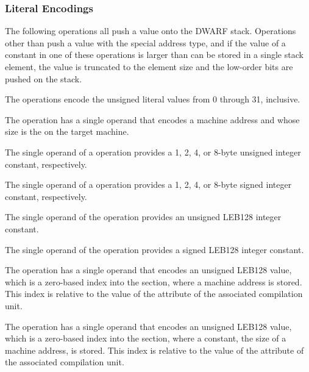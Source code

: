 \subsubsection{Literal Encodings}
\label{chap:literalencodings}
The 
following operations all push a value onto the DWARF
stack. 
Operations other than \DWOPconsttype{} push a value with the special 
address type, and if the value of a constant in one of these operations
is larger than can be stored in a single stack element, the
value is truncated to the element size and the low-order bits
are pushed on the stack.
\begin{enumerate}[1. ]
\itembfnl{\DWOPlitzeroTARG, \DWOPlitoneTARG, \dots, \DWOPlitthirtyoneTARG}
The \DWOPlitnTARG{} operations encode the unsigned literal values
from 0 through 31, inclusive.

\itembfnl{\DWOPaddrTARG}
The \DWOPaddrNAME{} operation has a single operand that encodes
a machine address and whose size is the 
on the target machine.

\itembfnl{\DWOPconstoneuTARG, \DWOPconsttwouTARG, \DWOPconstfouruTARG, \DWOPconsteightuTARG}
\DWOPconstnxMARK{}
The single operand of a \DWOPconstnuNAME{} operation provides a 1,
2, 4, or 8-byte unsigned integer constant, respectively.

\itembfnl{\DWOPconstonesTARG, \DWOPconsttwosTARG, \DWOPconstfoursTARG, \DWOPconsteightsTARG}
The single operand of a \DWOPconstnsNAME{} operation provides a 1,
2, 4, or 8-byte signed integer constant, respectively.

\itembfnl{\DWOPconstuTARG}
The single operand of the \DWOPconstuNAME{} operation provides
an unsigned LEB128 integer constant.

\itembfnl{\DWOPconstsTARG}
The single operand of the \DWOPconstsNAME{} operation provides
a signed LEB128 integer constant.

\itembfnl{\DWOPaddrxTARG}
The \DWOPaddrxNAME{} operation has a single operand that
encodes an unsigned LEB128 value, 
which is a zero-based index into the \dotdebugaddr{} section, 
where a machine address is stored.
This index is relative to the value of the 
\DWATaddrbase{} attribute of the associated compilation unit.

\itembfnl{\DWOPconstxTARG}
The \DWOPconstxNAME{} operation has a single operand that
encodes an unsigned LEB128 value, 
which is a zero-based
index into the \dotdebugaddr{} section, where a constant, the
size of a machine address, is stored.
This index is relative to the value of the 
\DWATaddrbase{} attribute of the associated compilation unit.


\end{enumerate}
